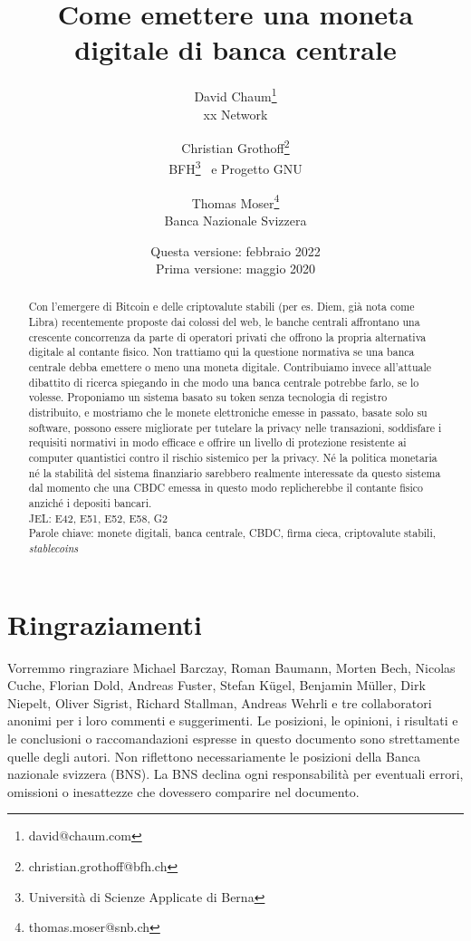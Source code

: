 \documentclass{article}
\title{Come emettere una moneta digitale di banca centrale}
\author{David Chaum\footnote{david@chaum.com} \\
  xx Network \and
  Christian Grothoff\footnote{christian.grothoff@bfh.ch} \\
  BFH\footnote{Università di Scienze Applicate di Berna}
  \ e Progetto GNU \and
  Thomas Moser\footnote{thomas.moser@snb.ch} \\
  Banca Nazionale Svizzera}
\date{Questa versione: febbraio 2022 \\
      Prima versione:  maggio 2020}
\begin{document}
\maketitle

\begin{abstract}
Con l'emergere di Bitcoin e delle criptovalute stabili (per es. Diem,
già nota come Libra) recentemente proposte dai colossi del web, le
banche centrali affrontano una crescente concorrenza da parte di
operatori privati che offrono la propria alternativa digitale al
contante fisico. Non trattiamo qui la questione normativa se una banca
centrale debba emettere o meno una moneta digitale. Contribuiamo invece
all'attuale dibattito di ricerca spiegando in che modo una banca centrale
potrebbe farlo, se lo volesse. Proponiamo un sistema basato su token
senza tecnologia di registro distribuito, e mostriamo che le monete
elettroniche emesse in passato, basate solo su software, possono essere
migliorate per tutelare la privacy nelle transazioni, soddisfare i
requisiti normativi in modo efficace e offrire un livello di protezione
resistente ai computer quantistici contro il rischio sistemico per
la privacy. Né la politica monetaria né la stabilità del sistema
finanziario sarebbero realmente interessate da questo sistema dal
momento che una CBDC emessa in questo modo replicherebbe il contante
fisico anziché i depositi bancari. \\

JEL: E42, E51, E52, E58, G2
\\

Parole chiave: monete digitali, banca centrale, CBDC, firma cieca,
criptovalute stabili, \textit{stablecoins}
\end{abstract}

\vspace{40pt}

\section*{Ringraziamenti}
Vorremmo ringraziare Michael Barczay, Roman Baumann, Morten Bech,
Nicolas Cuche, Florian Dold, Andreas Fuster, Stefan Kügel, Benjamin
Müller, Dirk Niepelt, Oliver Sigrist, Richard Stallman, Andreas Wehrli
e tre collaboratori anonimi per i loro commenti e suggerimenti. Le
posizioni, le opinioni, i risultati e le conclusioni o raccomandazioni
espresse in questo documento sono strettamente quelle degli autori.
Non riflettono necessariamente le posizioni della Banca nazionale
svizzera (BNS). La BNS declina ogni responsabilità per eventuali
errori, omissioni o inesattezze che dovessero comparire nel documento.
\end{document}
